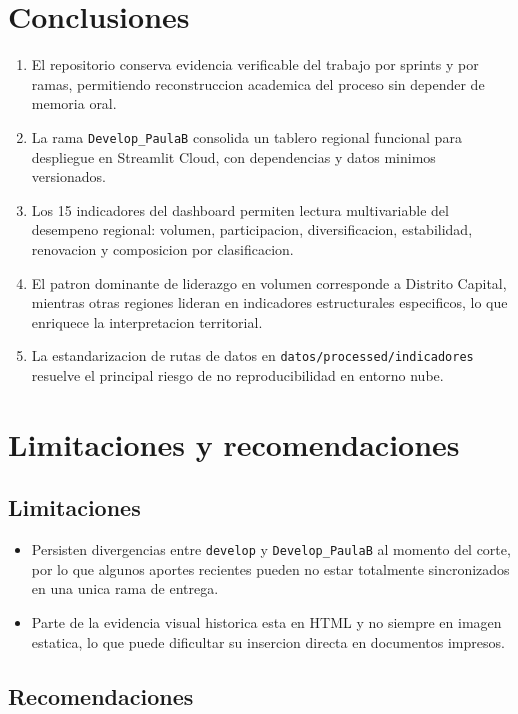 \documentclass[12pt,letterpaper]{article}
\begin{document}
\section{Conclusiones}

\begin{enumerate}[label=\arabic*.]
    \item El repositorio conserva evidencia verificable del trabajo por sprints y por ramas, permitiendo reconstruccion academica del proceso sin depender de memoria oral.
    \item La rama \texttt{Develop\_PaulaB} consolida un tablero regional funcional para despliegue en Streamlit Cloud, con dependencias y datos minimos versionados.
    \item Los 15 indicadores del dashboard permiten lectura multivariable del desempeno regional: volumen, participacion, diversificacion, estabilidad, renovacion y composicion por clasificacion.
    \item El patron dominante de liderazgo en volumen corresponde a Distrito Capital, mientras otras regiones lideran en indicadores estructurales especificos, lo que enriquece la interpretacion territorial.
    \item La estandarizacion de rutas de datos en \texttt{datos/processed/indicadores} resuelve el principal riesgo de no reproducibilidad en entorno nube.
\end{enumerate}

\section{Limitaciones y recomendaciones}

\subsection{Limitaciones}

\begin{itemize}
    \item Persisten divergencias entre \texttt{develop} y \texttt{Develop\_PaulaB} al momento del corte, por lo que algunos aportes recientes pueden no estar totalmente sincronizados en una unica rama de entrega.
    \item Parte de la evidencia visual historica esta en HTML y no siempre en imagen estatica, lo que puede dificultar su insercion directa en documentos impresos.
\end{itemize}

\subsection{Recomendaciones}
\end{document}
